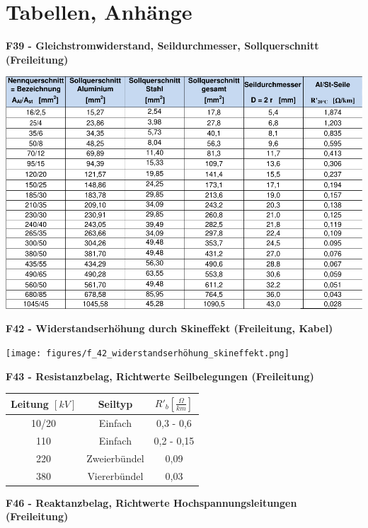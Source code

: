 \onecolumn
\section{Tabellen, Anhänge}
\large
\textbf{F39 - Gleichstromwiderstand, Seildurchmesser, Sollquerschnitt (Freileitung)}

\centering
\includegraphics[width=0.9\columnwidth]{figures/freileitung_f39_resistanzbelag.png}

\raggedright
\textbf{F42 - Widerstandserhöhung durch Skineffekt (Freileitung, Kabel)}

\centering
\texttt{[image: figures/f\_42\_widerstandserhöhung\_skineffekt.png]}

\raggedright

\newpage
\textbf{F43 - Resistanzbelag, Richtwerte Seilbelegungen (Freileitung)}

\begin{center}
\begin{tabular}[h]{|c|c|c|}
    \hline
    Leitung $[kV]$ & Seiltyp & $R'_b \left[ \frac{\Omega}{km} \right]$ \\
    \hline
    10/20 & Einfach& 0,3 - 0,6 \\
    \hline
    110 & Einfach& 0,2 - 0,15\\
    \hline
    220 & Zweierbündel& 0,09\\
    \hline
    380 & Viererbündel & 0,03\\
    \hline
\end{tabular}
\end{center}

\textbf{F46 - Reaktanzbelag, Richtwerte Hochspannungsleitungen (Freileitung)}

